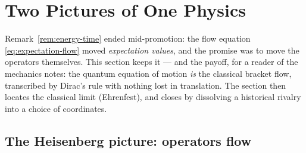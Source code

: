 \documentclass[11pt]{article}
\theoremstyle{plain}
\theoremstyle{definition}
\theoremstyle{remark}
\begin{document}
\section{Two Pictures of One Physics}
\label{sec:pictures}

Remark~\ref{rem:energy-time} ended mid-promotion: the flow equation
\eqref{eq:expectation-flow} moved \emph{expectation values}, and the
promise was to move the operators themselves. This section keeps it
--- and the payoff, for a reader of the mechanics notes: the quantum equation
of motion \emph{is} the classical bracket flow, transcribed by
Dirac's rule with nothing lost in translation. The section then
locates the classical limit (Ehrenfest), and closes by dissolving a
historical rivalry into a choice of coordinates.

\subsection{The Heisenberg picture: operators flow}
\label{sec:heisenberg-picture}
\end{document}
